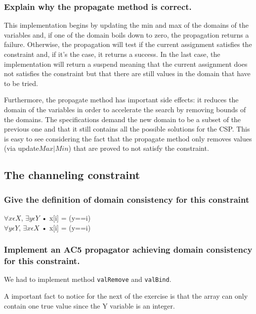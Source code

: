 \documentclass[a4paper ,12pt,french]{article}
\begin{document}
\subsubsection{Explain why the propagate method is correct.}
This implementation begins by updating the min and max of the domains of the variables and, if one of the domain boils down to zero, the propagation returns a failure. Otherwise, the propagation will test if the current assignment satisfies the constraint and, if it's the case, it returns a success. 
In the last case, the implementation will return a suspend meaning that the current assignment does not satisfies the constraint but that there are still values in the domain that have to be tried. 

Furthermore, the propagate method has important side effects: it reduces the domain of the variables in order to accelerate the search by removing bounds of the domains. The specifications demand the new domain to be a subset of the previous one and that it still contains all the possible solutions for the CSP. This is easy to see considering the fact that the propagate method only removes values (via update$Max\vert Min$) that are proved to not satisfy the constraint.


\subsection{The channeling constraint}
\subsubsection{Give the definition of domain consistency for this constraint}
\noindent$\forall x \epsilon X$, $\exists y \epsilon Y$ • x[i] = (y==i)\\
$\forall y \epsilon Y$, $\exists x \epsilon X$ • x[i] = (y==i)\\

\subsubsection{Implement an AC5 propagator achieving domain consistency for this constraint.}
We had to implement method \texttt{valRemove} and \texttt{valBind}.

A important fact to notice for the next of the exercise is that the array can only contain one true value since the Y variable is an integer.\\
\end{document}
